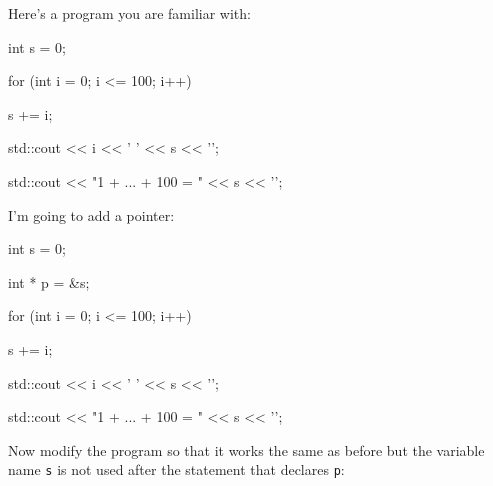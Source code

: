 Here's a program you are familiar with:



\begin{consolethree}[escapeinside=||]

int s = 0;



for (int i = 0; i <= 100; i++)

{   

    s += i;

    std::cout << i << ' ' << s << '\n';

}



std::cout << "1 + ... + 100 = " << s << '\n';

\end{consolethree}

I'm going to add a pointer:



\begin{consolethree}[escapeinside=||]

int s = 0;

int * p = &s;

for (int i = 0; i <= 100; i++)

{   

    s += i;

    std::cout << i << ' ' << s << '\n';

}



std::cout << "1 + ... + 100 = " << s << '\n';

\end{consolethree}



Now modify the program so that it works the same as before but the variable name \texttt{s} is not used after the statement that declares \texttt{p}:

